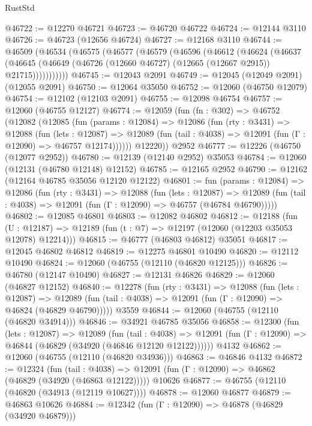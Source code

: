\begin{lexlean}{RustStd}
\begin{coremodule}
@46722 := @12270 @46721
@46723 := @46720 @46722
@46724 := @12144 @3110
@46726 := @46723 (@12656 @46724)
@46727 := @12168 @3110
@46744 := @46509
    (@46534
      (@46575
        (@46577
          (@46579
            (@46596
              (@46612
                (@46624
                  (@46637
                    (@46645
                      (@46649 (@46726 (@12660 @46727) (@12665 (@12667 @2915)) @21715)))))))))))
@46745 := @12043 @2091
@46749 := @12045 (@12049 @2091) (@12055 @2091)
@46750 := @12064 @35050
@46752 := @12060 (@46750 @12079)
@46754 := @12102 (@12103 @2091)
@46755 := @12098 @46754
@46757 := @12060 (@46755 @12127)
@46774 := @12059
    (fun (fn : @302) =>
    @46752
      (@12082
        (@12085
          (fun (params : @12084) =>
          @12086
            (fun (rty : @3431) =>
            @12088
              (fun (lets : @12087) =>
              @12089 (fun (tail : @4038) => @12091 (fun (Γ : @12090) => @46757 @12174))))))
        @12220))
    @2952
@46777 := @12226 (@46750 (@12077 @2952))
@46780 := @12139 (@12140 @2952) @35053
@46784 := @12060 (@12131 (@46780 @12148) @12152)
@46785 := @12165 @2952
@46790 := @12162 (@12164 @46785 @35056 @12120 @12122)
@46801 := fun (params : @12084) =>
  @12086
    (fun (rty : @3431) =>
    @12088
      (fun (lets : @12087) =>
      @12089 (fun (tail : @4038) => @12091 (fun (Γ : @12090) => @46757 (@46784 @46790)))))
@46802 := @12085 @46801
@46803 := @12082 @46802
@46812 := @12188
    (fun (U : @12187) => @12189 (fun (t : @7) => @12197 (@12060 (@12203 @35053 @12078) @12214)))
@46815 := @46777 (@46803 @46812) @35051
@46817 := @12045 @46802 @46812
@46819 := @12275 @46801 @10490
@46820 := @12112 @10490
@46824 := @12060 (@46755 (@12110 (@46820 @12125)))
@46826 := @46780 (@12147 @10490)
@46827 := @12131 @46826
@46829 := @12060 (@46827 @12152)
@46840 := @12278
    (fun (rty : @3431) =>
    @12088
      (fun (lets : @12087) =>
      @12089 (fun (tail : @4038) => @12091 (fun (Γ : @12090) => @46824 (@46829 @46790)))))
    @3559
@46844 := @12060 (@46755 (@12110 (@46820 @34914)))
@46846 := @34921 @46785 @35056
@46858 := @12300
    (fun (lets : @12087) =>
    @12089
      (fun (tail : @4038) =>
      @12091 (fun (Γ : @12090) => @46844 (@46829 (@34920 (@46846 @12120 @12122))))))
    @4132
@46862 := @12060 (@46755 (@12110 (@46820 @34936)))
@46863 := @46846 @4132
@46872 := @12324
    (fun (tail : @4038) => @12091 (fun (Γ : @12090) => @46862 (@46829 (@34920 (@46863 @12122)))))
    @10626
@46877 := @46755 (@12110 (@46820 (@34913 (@12119 @10627))))
@46878 := @12060 @46877
@46879 := @46863 @10626
@46884 := @12342 (fun (Γ : @12090) => @46878 (@46829 (@34920 @46879)))

\end{coremodule}
\end{lexlean}

